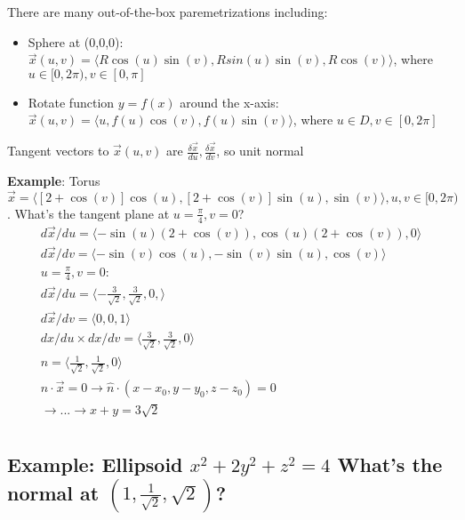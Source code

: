 \documentclass[11pt, oneside]{article}   	%
\begin{document}
There are many out-of-the-box paremetrizations including:

\begin{itemize}
\item Sphere at (0,0,0): $\vec{x}(u,v) = \langle R\cos(u)\sin(v), Rsin(u)\sin(v), R\cos(v)\rangle$, where $u \in [0, 2\pi), v \in [0, \pi]$
\item Rotate function $y = f(x)$ around the x-axis: $\vec{x}(u,v) = \langle u, f(u)\cos(v), f(u)\sin(v) \rangle$, where $u \in D, v \in [0, 2\pi]$
\end{itemize}

Tangent vectors to $\vec{x}(u,v)$ are $\frac{\delta \vec{x}} {du}, \frac{\delta \vec{x}} {dv}$, so unit normal 
					
\textbf{Example}: Torus $\vec{x} = \langle [2 + \cos(v)]\cos(u),  [2 + \cos(v)]\sin(u), \sin(v)\rangle, u,v \in [0,2 \pi)$.  What's the tangent plane at $u = \frac{\pi}{4}, v=0$?
\begin{align}
d\vec{x}/du = \langle -\sin(u)(2 + \cos(v)),  \cos(u)(2 + \cos(v)), 0 \rangle \\
d\vec{x}/dv = \langle -\sin(v)\cos(u), -\sin(v)\sin(u), \cos(v) \rangle \\
u = \frac{\pi}{4}, v=0 :  \\
d\vec{x}/du = \langle -\frac{3}{\sqrt{2}}, \frac{3}{\sqrt{2}}, 0, \rangle \\
d\vec{x}/dv = \langle 0, 0, 1 \rangle \\
dx/du \times dx/dv = \langle  \frac{3}{\sqrt{2}}, \frac{3}{\sqrt{2}}, 0\rangle \\
\hat{n} =  \langle \frac{1}{\sqrt{2}}, \frac{1}{\sqrt{2}}, 0 \rangle \\
\hat{n}  \cdot \vec{x} = 0 \rightarrow \hat{n} \cdot (x - x_0, y-y_0, z-z_0) = 0 \\
\rightarrow ... \rightarrow x + y = 3\sqrt{2}  \\
\end{align}



\subsection{Example: Ellipsoid $x^2 + 2y^2 + z^2 = 4$ What's the normal at $(1, \frac{1}{\sqrt{2}}, \sqrt{2})$?}
\end{document}
